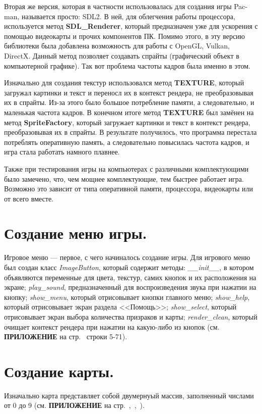 Вторая же версия, которая в частности использовалась для создания игры Pac-man, называется просто: SDL2. В ней, для облегчения работы процессора, используется метод \textbf{SDL\_Renderer},
который предназначен уже для ускорения с помощью видеокарты и прочих компонентов ПК. Помимо этого, в эту версию библиотеки была добавлена возможность для работы с OpenGL, Vulkan, DirectX.
Данный метод позволяет создавать спрайты (графический объект в компьютерной графике). Так вот проблема частоты кадров была именно в этом.

Изначально для создания текстур использовался метод \textbf{TEXTURE}, который загружал картинки и текст и переносл их в контекст рендера, не преобразовывая их в спрайты. Из-за этого было большое
потребление памяти, а следовательно, и маленькая частота кадров. В конечном итоге метод \textbf{TEXTURE} был замёнен на метод \textbf{SpriteFactory}, который загружает картинки и текст в контекст рендера, преобразовывая их в спрайты. В результате получилось, что программа перестала потреблять оперативную память, а следовательно повысилась частота кадров, и игра стала работать намного плавнее.

Также при тестирования игры на компьютерах с различными комплектующими было замечено, что, чем мощнее комплектующие, тем быстрее работает игра. Возможно это зависит от типа оперативной памяти, процессора, видеокарты или от всего вместе.

\section{\label{sec:ch02/sec01/sub03}Создание меню игры.}
Игровое меню --- первое, с чего начиналось создание игры. Для игрового меню был создан класс \textit{ImageButton}, который содержит методы: \textit{\_\_init\_\_}, в котором объявляются переменные для цвета, текстур, самих кнопок и их расположения на экране; \textit{play\_sound}, предназначенный для воспроизведения звука при нажатии на кнопку; \textit{show\_menu}, который отрисовывает кнопки главного меню; \textit{show\_help}, который отрисовывает экран раздела <<Помощь>>; \textit{show\_select}, который отрисовывает экран выбора количества призраков и карты; \textit{render\_clean}, который очищает контекст рендера при нажатии на какую-либо из кнопок (см. \textbf{\textsc{ПРИЛОЖЕНИЕ}} на стр.~\pageref{code:menu} строки 5-71).

\section{\label{sec:ch02/sec01/sub04}Создание карты.}
Изначально карта представляет собой двумернуый массив, заполненный числами от 0 до 9 (см. \textbf{\textsc{ПРИЛОЖЕНИЕ}} на стр.~\pageref{code:b1},~\pageref{code:b2},~\pageref{code:b3}).


